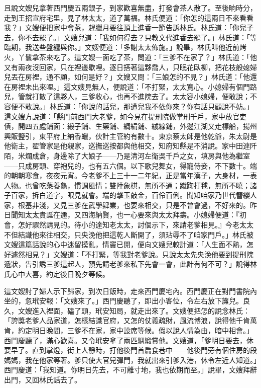 且說文嫂兒拿著西門慶五兩銀子，到家歡喜無盡，打發會茶人散了。至後晌時分，走到王招宣府宅里，見了林太太，道了萬福。林氏便道：「你怎的這兩日不來看看我？」文嫂便把家中會茶，趕臘月要往頂上進香一節告訴林氏。林氏道：「你兒子去，你不去罷了。」文嫂兒道：「我如何得去？只教文代進香去罷了。」林氏道：「等臨期，我送些盤纏與你。」文嫂便道：「多謝太太佈施。」說畢，林氏叫他近前烤火，丫鬟拿茶來吃了。這文嫂一面吃了茶，問道：「三爹不在家了？」林氏道：「他又有兩夜沒回家，只在裡邊歇哩。逐日搭著這夥喬人，只眠花臥柳，把花枝般媳婦兒丟在房裡，通不顧，如何是好？」文嫂又問：「三娘怎的不見？」林氏道：「他還在房裡未出來哩。」這文嫂見無人，便說道：「不打緊，太太寬心。小媳婦有個門路兒，管就打散了這夥人，三爹收心，也再不進院去了。太太容小媳婦，便敢說；不容便不敢說。」林氏道：「你說的話兒，那遭兒我不依你來？你有話只顧說不妨。」這文嫂方說道：「縣門前西門大老爹，如今見在提刑院做掌刑千戶，家中放官吏債，開四五處鋪面：緞子鋪、生藥鋪、綢絹鋪、絨線鋪，外邊江湖又走標船，揚州興販鹽引，東平府上納香蠟，伙計主管約有數十。東京蔡太師是他乾爺，朱太尉是他衛主，翟管家是他親家，巡撫巡按都與他相交，知府知縣是不消說。家中田連阡陌，米爛成倉，身邊除了大娘子——乃是清河左衛吳千戶之女，填房與他為繼室——只成房頭、穿袍兒的，也有五六個。以下歌兒舞女，得寵侍妾，不下數十。端的朝朝寒食，夜夜元宵。今老爹不上三十一二年紀，正是當年漢子，大身材，一表人物。也曾吃藥養龜，慣調風情；雙陸象棋，無所不通；蹴踘打毬，無所不曉；諸子百家，拆白道字，眼見就會。端的擊玉敲金，百伶百俐。聞知咱家乃世代簪纓人家，根基非淺，又見三爹在武學肄業，也要來相交，只是不曾會過，不好來的。昨日聞知太太貴誕在邇，又四海納賢，也一心要來與太太拜壽。小媳婦便道：『初會，怎好驟然請見的。待小的達知老太太，討個示下，來請老爹相見。』今老太太不但結識他來往相交，只央浼他把這乾人斷開了，須玷辱不了咱家門戶。」林氏被文嫂這篇話說的心中迷留摸亂，情竇已開，便向文嫂兒較計道：「人生面不熟，怎好遽然相見？」文嫂道：「不打緊，等我對老爹說。只說太太先央浼他要到提刑院遞狀，告引誘三爹這起人，預先請老爹來私下先會一會，此計有何不可？」說得林氏心中大喜，約定後日晚夕等候。

這文嫂討了婦人示下歸家，到次日飯時，走來西門慶宅內。西門慶正在對門書院內坐的，忽玳安報：「文嫂來了。」西門慶聽了，即出小客位，令左右放下簾兒。良久，文嫂進入裡面，磕了頭，玳安知局，就走出來了。文嫂便把怎的說念林氏：「誇獎老爹人品家道，怎樣結識官府，又怎的仗義疏財，風流博浪，說得他千肯萬肯，約定明日晚間，三爹不在家，家中設席等候。假以說人情為由，暗中相會。」西門慶聽了，滿心歡喜。又令玳安拿了兩匹綢緞賞他。文嫂道，「爹明日要去，休要早了。直到掌燈，街上人靜時，打他後門首扁食巷中——他後門旁有個住房的段媽媽，我在他家等著。爹只使大官兒彈門，我就出來引爹入港，休令左近人知道。」西門慶道：「我知道。你明日先去，不可離寸地，我也依期而至。」說畢，文嫂拜辭出門，又回林氏話去了。

